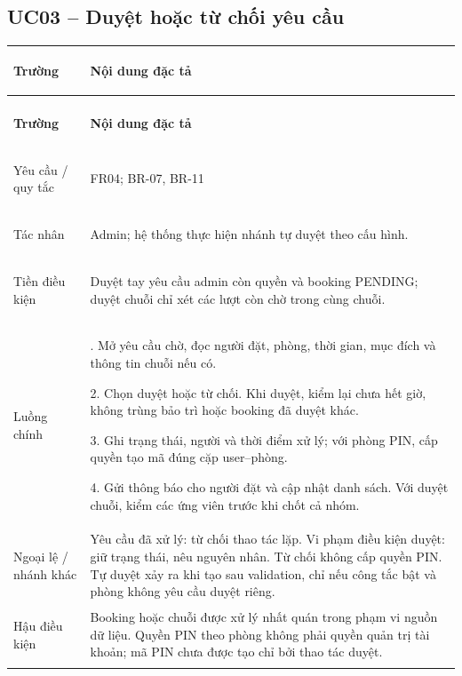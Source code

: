 \subsection{UC03 -- Duyệt hoặc từ chối yêu cầu}\label{tab:uc03}
{\small\renewcommand{\arraystretch}{1.06}
\setlength{\tabcolsep}{6pt}\setlength{\extrarowheight}{2pt}
\renewcommand{\theHtable}{uc.\arabic{subsection}}\addtocounter{table}{-1}
\begin{longtable}{|>{\bfseries\raggedright\arraybackslash}p{3cm}|>{\raggedright\arraybackslash}p{\dimexpr\textwidth-3cm-4\tabcolsep-3\arrayrulewidth\relax}|}
\hline
\textbf{Trường} & \textbf{Nội dung đặc tả}\\\hline
\endfirsthead
\multicolumn{2}{r}{\small\itshape UC03 (tiếp)}\\
\hline
\textbf{Trường} & \textbf{Nội dung đặc tả}\\\hline
\endhead
\endlastfoot
Yêu cầu / quy tắc & FR04; BR-07, BR-11\\*\hline
Tác nhân & Admin; hệ thống thực hiện nhánh tự duyệt theo cấu hình.\\*\hline
Tiền điều kiện & Duyệt tay yêu cầu admin còn quyền và booking PENDING; duyệt chuỗi chỉ xét các lượt còn chờ trong cùng chuỗi.\\*\hline
Luồng chính & 1. Mở yêu cầu chờ, đọc người đặt, phòng, thời gian, mục đích và thông tin chuỗi nếu có.\par
2. Chọn duyệt hoặc từ chối. Khi duyệt, kiểm lại chưa hết giờ, không trùng bảo trì hoặc booking đã duyệt khác.\par
3. Ghi trạng thái, người và thời điểm xử lý; với phòng PIN, cấp quyền tạo mã đúng cặp user--phòng.\par
4. Gửi thông báo cho người đặt và cập nhật danh sách. Với duyệt chuỗi, kiểm các ứng viên trước khi chốt cả nhóm.\\\hline
Ngoại lệ / nhánh khác & Yêu cầu đã xử lý: từ chối thao tác lặp. Vi phạm điều kiện duyệt: giữ trạng thái, nêu nguyên nhân. Từ chối không cấp quyền PIN. Tự duyệt xảy ra khi tạo sau validation, chỉ nếu công tắc bật và phòng không yêu cầu duyệt riêng.\\\hline
Hậu điều kiện & Booking hoặc chuỗi được xử lý nhất quán trong phạm vi nguồn dữ liệu. Quyền PIN theo phòng không phải quyền quản trị tài khoản; mã PIN chưa được tạo chỉ bởi thao tác duyệt.\\\hline
\end{longtable}}

